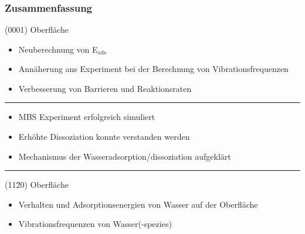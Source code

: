 \documentclass[hyperref={pdfpagelabels=false}]{beamer}
\begin{document}
\begin{frame}
\begin{columns}
\begin{center}
 \end{center}
 \end{columns}
 \newline~\newline~\newline
{}
\end{frame}


\section*{}
\begin{frame}
 \frametitle{Zusammenfassung}
 {\color{blue}(0001) Oberfläche}
\begin{itemize}
 \item Neuberechnung von E$_{\textrm{ads}}$ 
 \item Annäherung ans Experiment bei der Berechnung von Vibrationsfrequenzen
 \item Verbesserung von Barrieren und Reaktionsraten
\end{itemize}
 \pause\hrule
\begin{itemize}
 \item MBS Experiment erfolgreich simuliert
 \item Erhöhte Dissoziation konnte verstanden werden
 \item Mechanismus der Wasseradsorption/dissoziation aufgeklärt
\end{itemize}
 \pause\hrule
 {\color{blue}(11\=20) Oberfläche}
\begin{itemize}
 \item Verhalten und Adsorptionsenergien von Wasser auf der Oberfläche
 \item Vibrationsfrequenzen von Wasser(-spezies)
\end{itemize}
 \end{frame}
\end{document}
